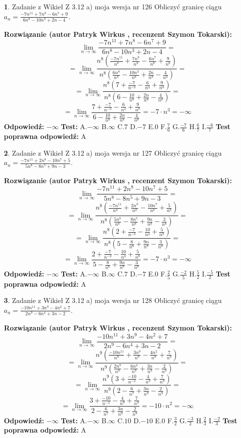 \documentclass[12pt, a4paper]{article}
\theoremstyle{definition} %
\newtheorem{zad}{}
\newcommand{\zadStart}[1]{\begin{zad}#1\newline}
\newcommand{\zadStop}{\end{zad}}
\newcommand{\rozwStart}[2]{\noindent \textbf{Rozwiązanie (autor #1 , recenzent #2): }\newline}
\newcommand{\rozwStop}{\newline}
\newcommand{\odpStart}{\noindent \textbf{Odpowiedź:}\newline}
\newcommand{\odpStop}{\newline}
\newcommand{\testStart}{\noindent \textbf{Test:}\newline}
\newcommand{\testStop}{\newline}
\newcommand{\kluczStart}{\noindent \textbf{Test poprawna odpowiedź:}\newline}
\newcommand{\kluczStop}{\newline}
\begin{document}
\zadStart{Zadanie z Wikieł Z 3.12 a) moja wersja nr 126}
Obliczyć granicę ciągu $a_{n}=\frac{-7n^{11}+7n^{8}-6n^{7}+9}{6n^{8}-10n^{3}+2n-4}$.
\zadStop
\rozwStart{Patryk Wirkus}{Szymon Tokarski}
$$\lim\limits_{n\to\infty}\frac{-7n^{11}+7n^{8}-6n^{7}+9}{6n^{8}-10n^{3}+2n-4}=$$
$$=\lim\limits_{n\to\infty}\frac{n^{8}\left(\frac{-7n^{11}}{n^{8}}+\frac{7n^{8}}{n^{8}}-\frac{6n^{7}}{n^{8}}+\frac{9}{n^{8}}\right)}{n^{8}\left(\frac{6n^{8}}{n^{8}}-\frac{10n^{3}}{n^{8}}+\frac{2n}{n^{8}}-\frac{4}{n^{8}}\right)}=$$
$$=\lim\limits_{n\to\infty}\frac{n^{8}\left(7+\frac{-7}{n^{-3}}-\frac{6}{n^{4}}+\frac{9}{n^{8}}\right)}
{n^{8}\left(6-\frac{10}{n^{8}}+\frac{2n}{n^{8}}-\frac{4}{n^{8}}\right)}=$$
$$=\lim\limits_{n\to\infty}\frac{7+\frac{-7}{n^{-3}}-\frac{6}{n^{4}}+\frac{9}{n^{8}}}{6-\frac{10}{n^{8}}+\frac{2n}{n^{8}}-\frac{4}{n^{8}}}=-7\cdot n^{3} = -\infty$$
\rozwStop
\odpStart
$-\infty$
\odpStop
\testStart
A.$-\infty$
B.$\infty$
C.$7$
D.$-7$
E.$0$
F.$\frac{7}{6}$
G.$\frac{-7}{6}$
H.$\frac{6}{7}$
I.$\frac{-6}{7}$
\testStop
\kluczStart
A
\kluczStop



\zadStart{Zadanie z Wikieł Z 3.12 a) moja wersja nr 127}
Obliczyć granicę ciągu $a_{n}=\frac{-7n^{11}+2n^{8}-10n^{7}+5}{5n^{8}-8n^{5}+9n-3}$.
\zadStop
\rozwStart{Patryk Wirkus}{Szymon Tokarski}
$$\lim\limits_{n\to\infty}\frac{-7n^{11}+2n^{8}-10n^{7}+5}{5n^{8}-8n^{5}+9n-3}=$$
$$=\lim\limits_{n\to\infty}\frac{n^{8}\left(\frac{-7n^{11}}{n^{8}}+\frac{2n^{8}}{n^{8}}-\frac{10n^{7}}{n^{8}}+\frac{5}{n^{8}}\right)}{n^{8}\left(\frac{5n^{8}}{n^{8}}-\frac{8n^{5}}{n^{8}}+\frac{9n}{n^{8}}-\frac{3}{n^{8}}\right)}=$$
$$=\lim\limits_{n\to\infty}\frac{n^{8}\left(2+\frac{-7}{n^{-3}}-\frac{10}{n^{4}}+\frac{5}{n^{8}}\right)}
{n^{8}\left(5-\frac{8}{n^{6}}+\frac{9n}{n^{8}}-\frac{3}{n^{8}}\right)}=$$
$$=\lim\limits_{n\to\infty}\frac{2+\frac{-7}{n^{-3}}-\frac{10}{n^{4}}+\frac{5}{n^{8}}}{5-\frac{8}{n^{6}}+\frac{9n}{n^{8}}-\frac{3}{n^{8}}}=-7\cdot n^{3} = -\infty$$
\rozwStop
\odpStart
$-\infty$
\odpStop
\testStart
A.$-\infty$
B.$\infty$
C.$7$
D.$-7$
E.$0$
F.$\frac{2}{5}$
G.$\frac{-2}{5}$
H.$\frac{5}{2}$
I.$\frac{-5}{2}$
\testStop
\kluczStart
A
\kluczStop



\zadStart{Zadanie z Wikieł Z 3.12 a) moja wersja nr 128}
Obliczyć granicę ciągu $a_{n}=\frac{-10n^{11}+3n^{9}-4n^{2}+7}{2n^{9}-6n^{4}+3n-2}$.
\zadStop
\rozwStart{Patryk Wirkus}{Szymon Tokarski}
$$\lim\limits_{n\to\infty}\frac{-10n^{11}+3n^{9}-4n^{2}+7}{2n^{9}-6n^{4}+3n-2}=$$
$$=\lim\limits_{n\to\infty}\frac{n^{9}\left(\frac{-10n^{11}}{n^{9}}+\frac{3n^{9}}{n^{9}}-\frac{4n^{2}}{n^{9}}+\frac{7}{n^{9}}\right)}{n^{9}\left(\frac{2n^{9}}{n^{9}}-\frac{6n^{4}}{n^{9}}+\frac{3n}{n^{9}}-\frac{2}{n^{9}}\right)}=$$
$$=\lim\limits_{n\to\infty}\frac{n^{9}\left(3+\frac{-10}{n^{-2}}-\frac{4}{n^{9}}+\frac{7}{n^{9}}\right)}
{n^{9}\left(2-\frac{6}{n^{7}}+\frac{3n}{n^{9}}-\frac{2}{n^{9}}\right)}=$$
$$=\lim\limits_{n\to\infty}\frac{3+\frac{-10}{n^{-2}}-\frac{4}{n^{9}}+\frac{7}{n^{9}}}{2-\frac{6}{n^{7}}+\frac{3n}{n^{9}}-\frac{2}{n^{9}}}=-10\cdot n^{2} = -\infty$$
\rozwStop
\odpStart
$-\infty$
\odpStop
\testStart
A.$-\infty$
B.$\infty$
C.$10$
D.$-10$
E.$0$
F.$\frac{3}{2}$
G.$\frac{-3}{2}$
H.$\frac{2}{3}$
I.$\frac{-2}{3}$
\testStop
\kluczStart
A
\kluczStop
\end{document}
